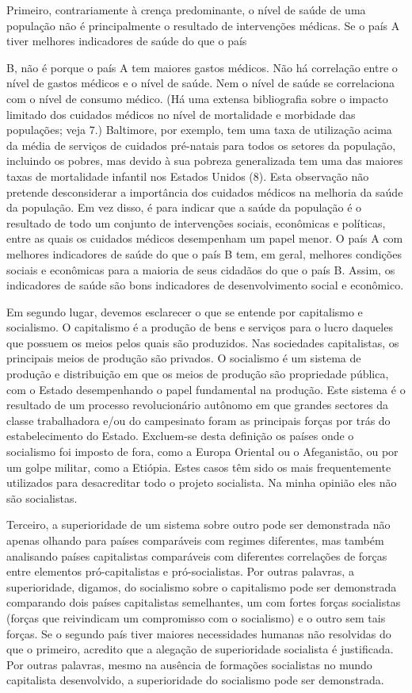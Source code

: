 \documentclass[twocolumn,amsmath,amssymb,aps,pre,floatfix]{revtex4-2}
\begin{document}
\par
Primeiro, contrariamente à crença predominante, o nível de saúde de uma população não é principalmente o resultado de intervenções médicas. Se o país A tiver melhores indicadores de saúde do que o país
\par
B, não é porque o país A tem maiores gastos médicos. Não há correlação entre o nível de gastos médicos e o nível de saúde. Nem o nível de saúde se correlaciona com o nível de consumo médico. (Há uma extensa bibliografia sobre o impacto limitado dos cuidados médicos no nível de mortalidade e morbidade das populações; veja 7.) Baltimore, por exemplo, tem uma taxa de utilização acima da média de serviços de cuidados pré-natais para todos os setores da população, incluindo os pobres, mas devido à sua pobreza generalizada tem uma das maiores taxas de mortalidade infantil nos Estados Unidos (8). Esta observação não pretende desconsiderar a importância dos cuidados médicos na melhoria da saúde da população. Em vez disso, é para indicar que a saúde da população é o resultado de todo um conjunto de intervenções sociais, econômicas e políticas, entre as quais os cuidados médicos desempenham um papel menor. O país A com melhores indicadores de saúde do que o país B tem, em geral, melhores condições sociais e econômicas para a maioria de seus cidadãos do que o país B. Assim, os indicadores de saúde são bons indicadores de desenvolvimento social e econômico.
\par
Em segundo lugar, devemos esclarecer o que se entende por capitalismo e socialismo. O capitalismo é a produção de bens e serviços para o lucro daqueles que possuem os meios pelos quais são produzidos. Nas sociedades capitalistas, os principais meios de produção são privados. O socialismo é um sistema de produção e distribuição em que os meios de produção são propriedade pública, com o Estado desempenhando o papel fundamental na produção. Este sistema é o resultado de um processo revolucionário autônomo em que grandes sectores da classe trabalhadora e/ou do campesinato foram as principais forças por trás do estabelecimento do Estado. Excluem-se desta definição os países onde o socialismo foi imposto de fora, como a Europa Oriental ou o Afeganistão, ou por um golpe militar, como a Etiópia. Estes casos têm sido os mais frequentemente utilizados para desacreditar todo o projeto socialista. Na minha opinião eles não são socialistas.
\par
Terceiro, a superioridade de um sistema sobre outro pode ser demonstrada não apenas olhando para países comparáveis ​​com regimes diferentes, mas também analisando países capitalistas comparáveis ​​com diferentes correlações de forças entre elementos pró-capitalistas e pró-socialistas. Por outras palavras, a superioridade, digamos, do socialismo sobre o capitalismo pode ser demonstrada comparando dois países capitalistas semelhantes, um com fortes forças socialistas (forças que reivindicam um compromisso com o socialismo) e o outro sem tais forças. Se o segundo país tiver maiores necessidades humanas não resolvidas do que o primeiro, acredito que a alegação de superioridade socialista é justificada. Por outras palavras, mesmo na ausência de formações socialistas no mundo capitalista desenvolvido, a superioridade do socialismo pode ser demonstrada.
\end{document}
